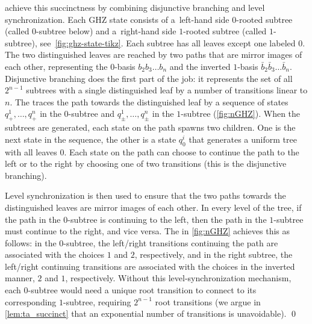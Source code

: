 \lstas achieve this succinctness by combining disjunctive branching and level synchronization. 
Each GHZ state consists of a~left-hand side $0$-rooted subtree (called
$0$-subtree below) and a~right-hand side $1$-rooted subtree (called $1$-subtree), see~\cref{fig:ghz-state-tikz}.
Each subtree has all leaves except one labeled $0$. 
The two distinguished leaves are reached by two paths that are mirror images of each other, 
representing the $0$-basis $b_2b_3\ldots b_n$ and the inverted $1$-basis ${\bar{b}_{2}\bar{b}_{3}\ldots \bar{b}_{n}}$.
%
Disjunctive branching does the first part of the job:
it represents the set of all $2^{n-1}$ subtrees with a single distinguished leaf by a number of transitions linear to $n$. 
The \lsta traces the path towards the distinguished leaf by a sequence of states $q_+^1,\ldots,q_+^n$ in the $0$-subtree and $q_\pm^1,\ldots,q_\pm^n$ in the $1$-subtree (\cref{fig:nGHZ}).
When the subtrees are generated, each state on the path spawns two children. One is the next state in the sequence, the other is a state $q_0^i$ that generates a uniform tree with all leaves $0$. 
Each state on the path can choose to continue the path to the left or to the right by choosing one of two transitions (this is the disjunctive branching). 


Level synchronization is then used to ensure that the two paths towards the distinguished leaves are mirror images of each other.
% 
In every level of the tree, if the path in the $0$-subtree is continuing to the left, then the path in the $1$-subtree must continue to the right, and vice versa. 
The \lsta in \cref{fig:nGHZ} achieves this as follows: in the $0$-subtree, the left/right transitions continuing the path are associated with the choices $1$ and $2$, respectively,
and in the right subtree, the left/right continuing transitions are associated with the choices in the inverted manner, $2$ and $1$, respectively.  
%
Without this level-synchronization mechanism, each $0$-subtree would need a unique root transition to connect to its corresponding $1$-subtree, requiring $2^{n-1}$ root transitions (we argue in \cref{lem:ta_succinct} that an exponential number of transitions is unavoidable). 
\qed
%

